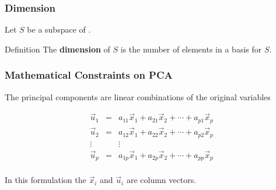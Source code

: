 \documentclass{beamer}
\begin{document}
\begin{frame}
  \frametitle{Dimension}
Let $S$ be a subspace of \RealN.
\bigskip

\begin{block}{Definition}
The \textbf{dimension} of $S$ is the number of elements in a basis for $S$.
\end{block}

\end{frame}






\begin{frame}
  \frametitle{Mathematical Constraints on PCA}

The principal components are linear combinations of the original variables
\smallskip

\[ \begin{array}{ccc}
\vec{u}_1 & = & a_{11}\vec{x}_1 + a_{21}\vec{x}_2 + \cdots + a_{p1}\vec{x}_p \\
\vec{u}_2 & = & a_{12}\vec{x}_1 + a_{22}\vec{x}_2 + \cdots + a_{p2}\vec{x}_p \\
\vdots & & \vdots \\
\vec{u}_p & = & a_{1p}\vec{x}_1 + a_{2p}\vec{x}_2 + \cdots + a_{pp}\vec{x}_p \\
\end{array}
\]

\bigskip

In this formulation the $\vec{x}_i$ and $\vec{u}_i$ are column vectors.
\end{frame}
\end{document}
